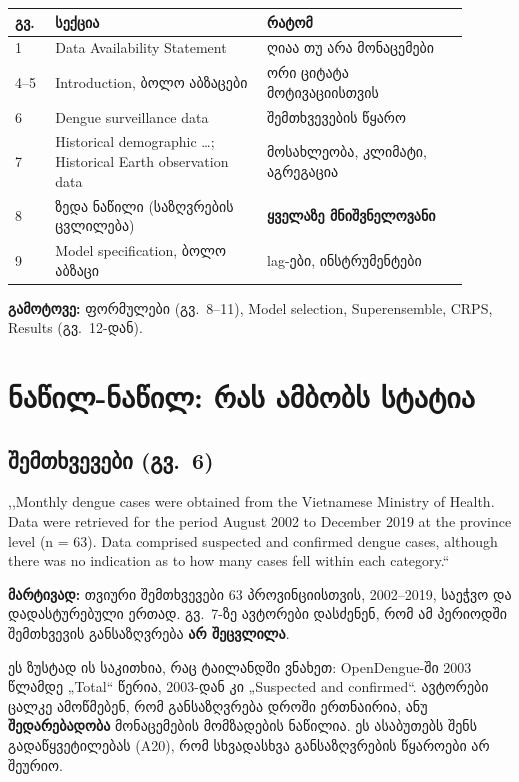 \documentclass[11pt,a4paper]{article}
\newcommand{\q}[1]{,,#1``}
\begin{document}
\begin{center}
\begin{tabular}{@{}p{0.08\linewidth}p{0.42\linewidth}p{0.4\linewidth}@{}}
\toprule
გვ. & სექცია & რატომ \\
\midrule
1 & Data Availability Statement & ღიაა თუ არა მონაცემები \\
4--5 & Introduction, ბოლო აბზაცები & ორი ციტატა მოტივაციისთვის \\
6 & Dengue surveillance data & შემთხვევების წყარო \\
7 & Historical demographic \ldots; Historical Earth observation data & მოსახლეობა, კლიმატი, აგრეგაცია \\
8 & ზედა ნაწილი (საზღვრების ცვლილება) & \textbf{ყველაზე მნიშვნელოვანი} \\
9 & Model specification, ბოლო აბზაცი & lag-ები, ინსტრუმენტები \\
\bottomrule
\end{tabular}
\end{center}

\noindent\textbf{გამოტოვე:} ფორმულები (გვ.\ 8--11), Model selection, Superensemble, CRPS, Results (გვ.\ 12-დან).

\section{ნაწილ-ნაწილ: რას ამბობს სტატია}

\subsection{შემთხვევები (გვ.\ 6)}
\begin{citata}
\q{Monthly dengue cases were obtained from the Vietnamese Ministry of Health. Data were retrieved for the period
August 2002 to December 2019 at the province level (n = 63). Data comprised suspected and confirmed dengue cases,
although there was no indication as to how many cases fell within each category.}
\end{citata}
\noindent\textbf{მარტივად:} თვიური შემთხვევები 63 პროვინციისთვის, 2002--2019, საეჭვო და დადასტურებული ერთად.
გვ.\ 7-ზე ავტორები დასძენენ, რომ ამ პერიოდში შემთხვევის განსაზღვრება \textbf{არ შეცვლილა}.

\begin{mnishvn}
ეს ზუსტად ის საკითხია, რაც ტაილანდში ვნახეთ: OpenDengue-ში 2003 წლამდე „Total“ წერია, 2003-დან კი
„Suspected and confirmed“. ავტორები ცალკე ამოწმებენ, რომ განსაზღვრება დროში ერთნაირია, ანუ
\textbf{შედარებადობა} მონაცემების მომზადების ნაწილია. ეს ასაბუთებს შენს გადაწყვეტილებას (A20), რომ
სხვადასხვა განსაზღვრების წყაროები არ შეურიო.
\end{mnishvn}
\end{document}
